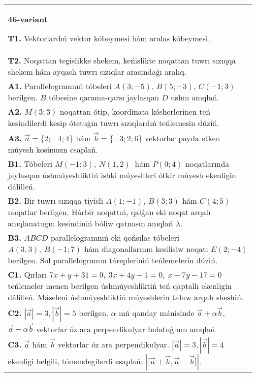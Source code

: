 \documentclass{article}
\begin{document}
\begin{tabular}{m{17cm}}
\textbf{46-variant}

\textbf{T1.} 
Vektorlardıń vektor kóbeymesi hám aralas kóbeymesi.
 \\
\textbf{T2.} 
Noqattan tegislikke shekem, keńislikte noqattan tuwrı sızıqqa shekem hám ayqash tuwrı sızıqlar arasındaǵı aralıq.
 \\
\textbf{A1.} 
Parallelogramnıń tóbeleri
$A (3;-5) $, $B (5;-3) $, $C (-1;3) $ berilgen. $B$ tóbesine
qarama-qarsı jaylasqan $D$ ushın anıqlań.
 \\
\textbf{A2.} 
$M (3;3) $ noqattan ótip, koordinata kósherlerinen teń
kesindilerdi kesip ótetuģın tuwrı sızıqlardıń teńlemesin dúziń.
 \\
\textbf{A3.} 
$\overrightarrow{a} = \{ 2; - 4;4\}$ hám $\overrightarrow{b} = \{ - 3;2;6\}$
vektorlar payda etken múyesh kosinusın esaplań.
 \\
\textbf{B1.} 
Tóbeleri \(M (-1;3),\ N (1,2) \ \) hám \(P (0;4) \)
noqatlarında jaylasqan úshmúyeshliktiń ishki múyeshleri ótkir múyesh
ekenligin dálilleń.
 \\
\textbf{B2.} 
Bir tuwrı sızıqqa tiyisli \(A (1;-1),\ B (3;3) \) hám
\(C (4;5) \) noqatlar berilgen. Hárbir noqattıń, qalǵan eki noqat arqalı anıqlanatuģın kesindiniń bóliw qatnasın anıqlań $\lambda$.
 \\
\textbf{B3.} 
$ABCD$ parallelogramnıń eki qońsılas tóbeleri
\(A (3,3),\ B (-1;7) \) hám diagonallarının kesilisiw noqatı
\(E (2;-4) \) berilgen. Sol parallelogramm tárepleriniń teńlemelerin
dúziń.
 \\
\textbf{C1.} 
Qırları
\(7x+y+31=0,\ 3x+4y-1=0,\ x-7y-17=0\) teńlemeler
menen berilgen úshmúyeshliktiń teń qaptallı ekenligin dálilleń.
Máseleni úshmúyeshliktiń
múyeshlerin tabıw arqalı sheshiń.
 \\
\textbf{C2.} 
$|\vec{a}| = 3,|\vec{b}| = 5$ berilgen. $\alpha$ nıń qanday mánisinde $\vec{a} + \alpha\vec{b}$, $\vec{a} - \alpha\vec{b}$ vektorlar óz ara perpendikulyar bolatuģının anıqlań.
 \\
\textbf{C3.} 
$\vec{a}$ hám $\vec{b}$ vektorlar óz ara perpendikulyar. $|\vec{a}| = 3,|\vec{b}| = 4$ ekenligi belgili, tómendegilerdi esaplań:
$|\lbrack\vec{a} + \vec{b},\vec{a} - \vec{b}\rbrack|$.
 \\

\end{tabular}
\vspace{1cm}
\end{document}
